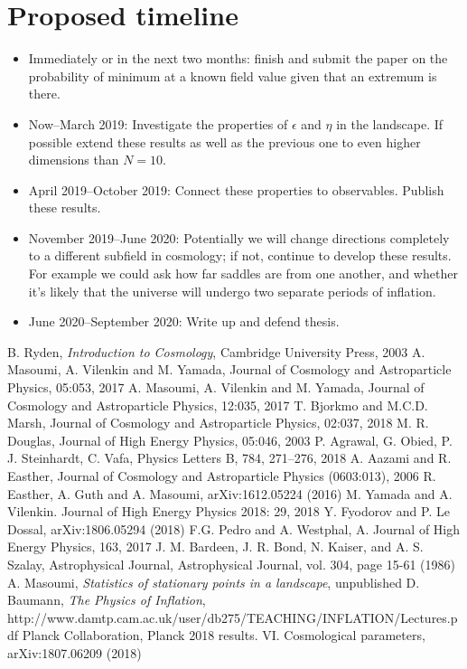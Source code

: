 \documentclass[12pt]{article}
\begin{document}
\section{Proposed timeline}
\begin{itemize}
\item Immediately or in the next two months: finish and submit the paper on the probability of minimum at a known field value given that an extremum is there.
\item Now--March 2019: Investigate the properties of $\epsilon$ and $\eta$ in the landscape. If possible extend these results as well as the previous one to even higher dimensions than $N=10$.
\item April 2019--October 2019: Connect these properties to observables. Publish these results.
\item November 2019--June 2020: Potentially we will change directions completely to a different subfield in cosmology; if not, continue to develop these results. For example we could ask how far saddles are from one another, and whether it's likely that the universe will undergo two separate periods of inflation.
\item June 2020--September 2020: Write up and defend thesis.
\end{itemize}

\begin{thebibliography}{99}
 B. Ryden, \emph{Introduction to Cosmology}, Cambridge University Press, 2003
 A. Masoumi, A. Vilenkin and M. Yamada, Journal of Cosmology and Astroparticle Physics, 05:053, 2017
 A. Masoumi, A. Vilenkin and M. Yamada, Journal of Cosmology and Astroparticle Physics, 12:035, 2017
 T. Bjorkmo and M.C.D. Marsh, Journal of Cosmology and Astroparticle Physics, 02:037, 2018
 M. R. Douglas, Journal of High Energy Physics, 05:046, 2003
 P. Agrawal, G. Obied, P. J. Steinhardt, C. Vafa, Physics Letters B, 784, 271--276, 2018
 A. Aazami and R. Easther, Journal of Cosmology and Astroparticle Physics (0603:013), 2006
 R. Easther, A. Guth and A. Masoumi, arXiv:1612.05224 (2016)
 M. Yamada and A. Vilenkin. Journal of High Energy Physics 2018: 29, 2018
 Y. Fyodorov and P. Le Dossal, arXiv:1806.05294 (2018)
 F.G. Pedro and A. Westphal, A. Journal of High Energy Physics, 163, 2017
 J. M. Bardeen, J. R. Bond, N. Kaiser, and A. S. Szalay, Astrophysical Journal, Astrophysical Journal, vol. 304, page 15-61 (1986)
 A. Masoumi, \emph{Statistics of stationary points in a landscape}, unpublished
 D. Baumann, \emph{The Physics of Inflation}, http://www.damtp.cam.ac.uk/user/db275/TEACHING/INFLATION/Lectures.pdf
 Planck Collaboration, Planck 2018 results. VI. Cosmological parameters, arXiv:1807.06209 (2018)
\end{thebibliography}
\end{document}
